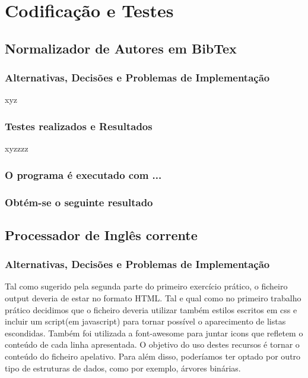 \documentclass{report}
\begin{document}
\chapter{Codificação e Testes} \label{ct}

\section{Normalizador de Autores em BibTex}

\subsection{Alternativas, Decisões e Problemas de Implementação}
xyz

\subsection{Testes realizados e Resultados}
xyzzzz

\subsection{O programa é executado com ...}


\subsection{Obtém-se o seguinte resultado}

\section{Processador de Inglês corrente}

\subsection{Alternativas, Decisões e Problemas de Implementação}
Tal como sugerido pela segunda parte do primeiro exercício prático, o ficheiro output deveria de estar no formato HTML.
Tal e qual como no primeiro trabalho prático decidimos que o ficheiro deveria utilizar também estilos escritos em css e incluir um script(em javascript) para 
tornar possível o aparecimento de listas escondidas. 
Também foi utilizada a font-awesome para juntar icons que refletem o conteúdo de cada linha apresentada. 
O objetivo do uso destes recursos é tornar o conteúdo do ficheiro apelativo.
Para além disso, poderíamos ter optado por outro tipo de estruturas de dados, como por exemplo, árvores binárias. 
\end{document}
